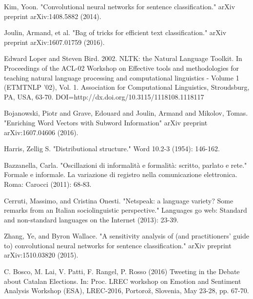 \begin{thebibliography}{1}

Kim, Yoon. "Convolutional neural networks for sentence classification." arXiv preprint arXiv:1408.5882 (2014).

Joulin, Armand, et al. "Bag of tricks for efficient text classification." arXiv preprint arXiv:1607.01759 (2016).

Edward Loper and Steven Bird. 2002. NLTK: the Natural Language Toolkit. In Proceedings of the ACL-02 Workshop on Effective tools and methodologies for teaching natural language processing and computational linguistics - Volume 1 (ETMTNLP '02), Vol. 1. Association for Computational Linguistics, Stroudsburg, PA, USA, 63-70. DOI=http://dx.doi.org/10.3115/1118108.1118117


Bojanowski, Piotr and Grave, Edouard and Joulin, Armand and Mikolov, Tomas. "Enriching Word Vectors with Subword Information" arXiv preprint arXiv:1607.04606 (2016).

Harris, Zellig S. "Distributional structure." Word 10.2-3 (1954): 146-162.

Bazzanella, Carla. "Oscillazioni di informalità e formalità: scritto, parlato e rete." Formale e informale. La variazione di registro nella comunicazione elettronica. Roma: Carocci (2011): 68-83.

Cerruti, Massimo, and Cristina Onesti. "Netspeak: a language variety? Some remarks from an Italian sociolinguistic perspective." Languages go web: Standard and non-standard languages on the Internet (2013): 23-39.

Zhang, Ye, and Byron Wallace. "A sensitivity analysis of (and practitioners' guide to) convolutional neural networks for sentence classification." arXiv preprint arXiv:1510.03820 (2015).

C. Bosco, M. Lai, V. Patti, F. Rangel, P. Rosso (2016) Tweeting in the Debate about Catalan Elections. In: Proc. LREC workshop on Emotion and Sentiment Analysis Workshop (ESA), LREC-2016, Portorož, Slovenia, May 23-28, pp. 67-70.


\end{thebibliography}
